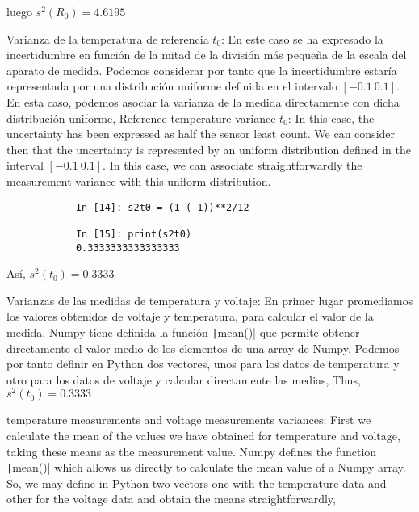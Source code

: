 luego $s^2(R_0)= 4.6195$
\begin{paracol}{2}
\textbullet Varianza de la temperatura de referencia $t_0$: En este caso se ha expresado la incertidumbre en función de la mitad de la división más pequeña de la escala del aparato de medida. Podemos considerar por tanto que la incertidumbre estaría representada por una distribución uniforme definida en el intervalo $[-0.1\ 0.1]$. En esta caso, podemos asociar la varianza de la medida directamente con dicha distribución uniforme,
\switchcolumn
\textbullet Reference temperature variance $t_0$: In this case, the uncertainty has been expressed as half the sensor least count. We can consider then that the uncertainty is represented by an uniform distribution defined in the interval $[-0.1\ 0.1]$. In this case, we can associate straightforwardly the measurement variance with this uniform distribution.  
\end{paracol}

\begin{center}
	\begin{minipage}{\textwidth}
		\begin{verbatim}
			In [14]: s2t0 = (1-(-1))**2/12

			In [15]: print(s2t0)
			0.3333333333333333		
		\end{verbatim}
	\end{minipage}
\end{center}

\begin{paracol}{2}
Así, $s^2(t_0)=0.3333$

\textbullet Varianzas de las medidas de temperatura y voltaje:
En primer lugar promediamos los valores  obtenidos de voltaje y temperatura, para calcular el valor de la medida. Numpy tiene definida la función \texttt|mean()| que permite obtener directamente el valor medio de los elementos de una array de Numpy. Podemos por tanto definir en Python dos vectores, unos para los datos de temperatura y otro para los datos de voltaje y calcular directamente las medias,
\switchcolumn
Thus, $s^2(t_0)=0.3333$

\textbullet temperature measurements and voltage measurements variances:
First we calculate the mean of the values we have obtained for temperature and voltage, taking these means as the measurement value. Numpy defines the function \texttt|mean()| which allows us directly to calculate the mean value of a Numpy array. So, we may define in Python two vectors one with the temperature data and other for the voltage data and obtain the means straightforwardly, 
\end{paracol}

